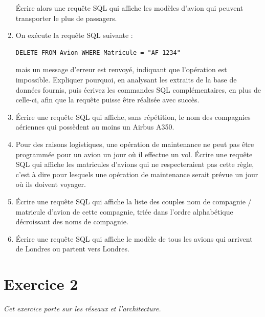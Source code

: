 \documentclass[11pt,a4paper,french,twoside]{PMCours}
\begin{document}
\begin{enumerate}
Écrire alors une requête SQL qui affiche les modèles d'avion qui peuvent transporter le plus de passagers.
\item On exécute la requête SQL suivante :
\begin{verbatim}
DELETE FROM Avion WHERE Matricule = "AF 1234"
\end{verbatim} 
mais un message d'erreur est renvoyé, indiquant que l'opération est impossible. Expliquer pourquoi, en analysant les extraits de la base de données fournis, puis écrivez les commandes SQL complémentaires, en plus de celle-ci, afin que la requête puisse être réalisée avec succès.
\item Écrire une requête SQL qui affiche, sans répétition, le nom des compagnies aériennes qui possèdent au moins un Airbus A350.
\item Pour des raisons logistiques, une opération de maintenance ne peut pas être programmée pour un avion un jour où il effectue un vol. Écrire une requête SQL qui affiche les matricules d'avions qui ne respecteraient pas cette règle, c'est à dire pour lesquels une opération de maintenance serait prévue un jour où ils doivent voyager. 
\item Écrire une requête SQL qui affiche la liste des couples nom de compagnie / matricule d'avion de cette compagnie, triée dans l'ordre alphabétique décroissant des noms de compagnie.
\item Écrire une requête SQL qui affiche le modèle de tous les avions qui arrivent de Londres ou partent vers Londres.
\end{enumerate}


\newpage
\section*{Exercice 2}
\emph{Cet exercice porte sur les réseaux et l'architecture.}
\end{document}

